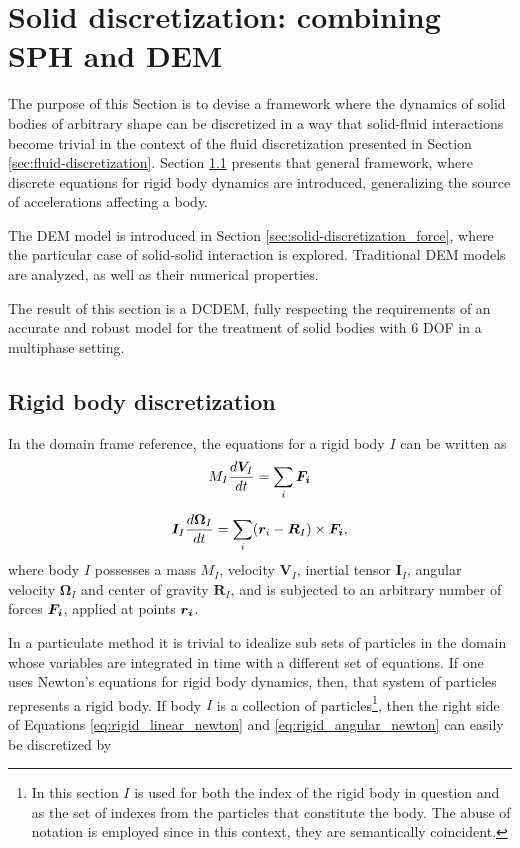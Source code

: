 \newpage
\section{Solid discretization: combining SPH and DEM}
\label{sec:solid-discretization}

The purpose of this Section is to devise a framework where the dynamics of solid bodies of arbitrary shape can be discretized in a way that solid-fluid interactions become trivial in the context of the fluid discretization presented in Section \ref{sec:fluid-discretization}. Section \ref{sec:solid-discretization_body} presents that general framework, where discrete equations for rigid body dynamics are introduced, generalizing the source of accelerations affecting a body. 

The \ac{DEM} model is introduced in Section \ref{sec:solid-discretization_force}, where the particular case of solid-solid interaction is explored. Traditional \ac{DEM} models are analyzed, as well as their numerical properties.

The result of this section is a \ac{DCDEM}, fully respecting the requirements of an accurate and robust model for the treatment of solid bodies with 6 \ac{DOF} in a multiphase setting.


\subsection{Rigid body discretization}
\label{sec:solid-discretization_body}

In the domain frame reference, the equations for a rigid body $I$ can be written as
%
\begin{equation} \label{eq:rigid_linear_newton}
	M_I\frac{d\boldsymbol{V}_I}{dt}=\sum_i \boldsymbol{F_i}
\end{equation}

\begin{equation} \label{eq:rigid_angular_newton}
	\boldsymbol{I}_I\frac{d\boldsymbol{\Omega}_I}{dt}=\sum_i(\boldsymbol{r}_i-\boldsymbol{R}_I)\times \boldsymbol{F_i},
\end{equation}
%
where body $I$ possesses a mass $M_I$, velocity $\boldsymbol{V}_I$, inertial tensor $\boldsymbol{I}_I$, angular velocity $\boldsymbol{\Omega}_I$ and center of gravity $\boldsymbol{R}_I$, and is subjected to an arbitrary number of forces $\boldsymbol{F_i}$, applied at points $\boldsymbol{r_i}$. 

In a particulate method it is trivial to idealize sub sets of particles in the domain whose variables are integrated in time with a different set of equations. If one uses Newton's equations for rigid body dynamics, then, that system of particles represents a rigid body. If body $I$ is a collection of particles\footnote{In this section $I$ is used for both the index of the rigid body in question and as the set of indexes from the particles that constitute the body. The abuse of notation is employed since in this context, they are semantically coincident.}, then the right side of Equations \eqref{eq:rigid_linear_newton} and \eqref{eq:rigid_angular_newton} can easily be discretized by

